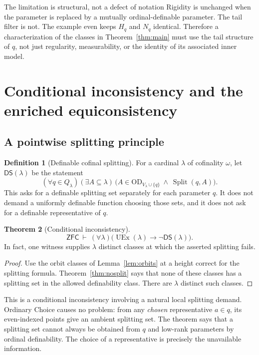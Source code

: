 \documentclass[11pt,letterpaper]{article}
\theoremstyle{definition}
\newtheorem{definition}{Definition}[section]
\newtheorem{theorem}[definition]{Theorem}
\numberwithin{equation}{section}
\newcommand{\ZFC}{\mathsf{ZFC}}
\newcommand{\OD}{\mathrm{OD}}
\newcommand{\UEx}{\operatorname{UEx}}
\newcommand{\Split}{\operatorname{Split}}
\newcommand{\DS}{\mathsf{DS}}
\begin{document}
\begin{assessment}{The limitation is structural, not a defect of notation}
Rigidity is unchanged when the parameter is replaced by a mutually ordinal-definable parameter. The tail filter is not. The example even keeps $H_q$ and $N_q$ identical. Therefore a characterization of the classes in Theorem~\ref{thm:main} must use the tail structure of $q$, not just regularity, measurability, or the identity of its associated inner model.
\end{assessment}

\section{Conditional inconsistency and the enriched equiconsistency}\label{sec:consistency}

\subsection{A pointwise splitting principle}

\begin{definition}[Definable cofinal splitting]
For a cardinal $\lambda$ of cofinality $\omega$, let $\DS(\lambda)$ be the statement
\[
 (\forall q\in Q_\lambda)(\exists A\subseteq\lambda)\,
 \bigl(A\in\OD_{V_\lambda\cup\{q\}}\ \wedge\ \Split(q,A)\bigr).
\]
This asks for a definable splitting set separately for each parameter $q$. It does not demand a uniformly definable function choosing those sets, and it does not ask for a definable representative of $q$.
\end{definition}

\begin{theorem}[Conditional inconsistency]\label{thm:DS}
\[
 \ZFC\ \vdash\ (\forall\lambda)\bigl(\UEx(\lambda)\longrightarrow
                                      \neg\DS(\lambda)\bigr).
\]
In fact, one witness supplies $\lambda$ distinct classes at which the asserted splitting fails.
\end{theorem}

\begin{proof}
Use the orbit classes of Lemma~\ref{lem:orbits} at a height correct for the splitting formula. Theorem~\ref{thm:nosplit} says that none of these classes has a splitting set in the allowed definability class. There are $\lambda$ distinct such classes.
\end{proof}

This is a conditional inconsistency involving a natural local splitting demand. Ordinary Choice causes no problem: from any \emph{chosen} representative $a\in q$, its even-indexed points give an ambient splitting set. The theorem says that a splitting set cannot always be obtained from $q$ and low-rank parameters by ordinal definability. The choice of a representative is precisely the unavailable information.
\end{document}
